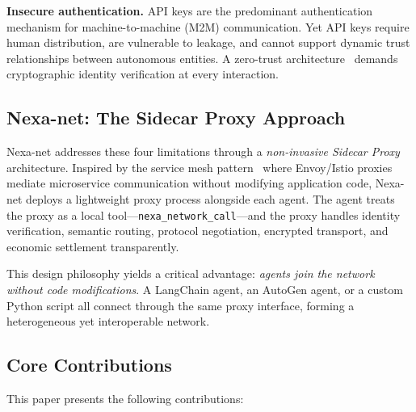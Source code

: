 \textbf{Insecure authentication.} API keys are the predominant authentication mechanism for machine-to-machine (M2M) communication. Yet API keys require human distribution, are vulnerable to leakage, and cannot support dynamic trust relationships between autonomous entities. A zero-trust architecture~\cite{nist2020zerotrust,ward2016beyondcorp} demands cryptographic identity verification at every interaction.

\subsection{Nexa-net: The Sidecar Proxy Approach}

Nexa-net addresses these four limitations through a \emph{non-invasive Sidecar Proxy} architecture. Inspired by the service mesh pattern~\cite{envoy2017,istio2018,linkerd2018} where Envoy/Istio proxies mediate microservice communication without modifying application code, Nexa-net deploys a lightweight proxy process alongside each agent. The agent treats the proxy as a local tool---\texttt{nexa\_network\_call}---and the proxy handles identity verification, semantic routing, protocol negotiation, encrypted transport, and economic settlement transparently.

This design philosophy yields a critical advantage: \emph{agents join the network without code modifications}. A LangChain agent, an AutoGen agent, or a custom Python script all connect through the same proxy interface, forming a heterogeneous yet interoperable network.

\subsection{Core Contributions}

This paper presents the following contributions:

